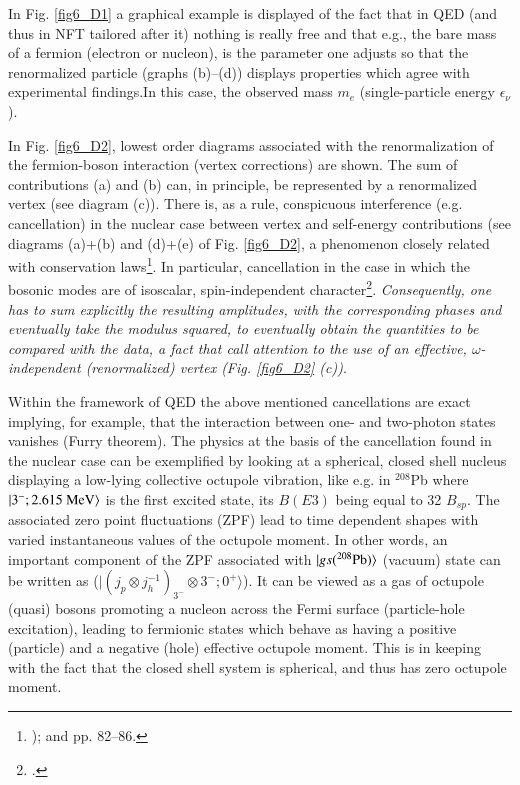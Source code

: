 In Fig. \ref{fig6_D1} a graphical example is displayed of the fact that in QED (and thus in NFT tailored after it) nothing is really free and that e.g., the bare mass of a fermion (electron or nucleon), is the parameter one adjusts so that the renormalized particle (graphs (b)--(d)) displays properties which agree with experimental findings.In this case, the observed mass $m_e$ (single-particle energy $\epsilon_\nu$). 


In Fig. \ref{fig6_D2}, lowest order diagrams associated with the renormalization of the fermion-boson interaction (vertex corrections) are shown. The sum of contributions (a) and (b) can, in principle, be represented by a renormalized vertex (see diagram (c)). There is, as a rule, conspicuous interference (e.g. cancellation) in the nuclear case between vertex and self-energy contributions (see diagrams (a)+(b) and (d)+(e) of Fig. \ref{fig6_D2}, a phenomenon closely related with conservation laws\footnote{ \cite{Schrieffer:64}); \cite{Bortignon:81,Bertsch:83} and \cite{Bortignon:98} pp. 82--86.}. In particular, cancellation in the case in which the bosonic modes are of isoscalar, spin-independent character\footnote{\cite{Bortignon:83}.}. \textit{Consequently, one has to sum explicitly the resulting amplitudes, with the corresponding phases and eventually take the modulus squared,  to eventually obtain the quantities to be compared with the data, a fact that call attention to the use of an effective, $\omega$-independent (renormalized) vertex (Fig. \ref{fig6_D2} (c))}.

Within the framework of QED the above mentioned cancellations are exact implying, for example, that the interaction between one- and two-photon states vanishes (Furry theorem). The physics at the basis of the cancellation found in the nuclear case can be exemplified by looking at a spherical, closed shell nucleus displaying a low-lying collective octupole vibration, like e.g. in $^{208}$Pb where $|{3^-;2.615\text{ MeV}} \rangle$ is the first excited state, its $B(E3)$ being equal to 32 $B_{sp}$. The associated zero point fluctuations (ZPF) lead to time dependent shapes with varied instantaneous values of the octupole moment. In other words, an important component of the ZPF associated with $|{gs(^{208}\text{Pb})} \rangle$ (vacuum) state can be written as ($|(j_p \otimes j_h^{-1})_{3^-} \otimes 3^-; 0^+\rangle $). It can be viewed as a  gas of octupole (quasi) bosons promoting a nucleon across the Fermi surface (particle-hole excitation), leading to fermionic states which behave as having a positive (particle) and a negative (hole) effective octupole moment. This is in keeping with the fact that the closed shell system is spherical, and thus has zero octupole moment.

